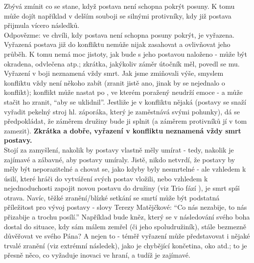\documentclass[../main.tex]{subfiles}
\begin{document}
Zbývá zmínit co se stane, když postava není schopna pokrýt posuny. K tomu může dojít například v delším souboji se silnými protivníky, kdy již postava přijmula vícero následků.\\ 
Odpovězme: ve chvíli, kdy postava není schopna posuny pokrýt, je vyřazena. Vyřazená postava již do konfliktu nemůže nijak zasahovat a ovlivňovat jeho průběh. K tomu nemá moc jistoty, jak bude s jeho postavou naloženo - může být okradena, odvlečena atp.; zkrátka, jakýkoliv záměr útočník měl, povedl se mu. \\
Vyřazení v boji neznamená vždy smrt. Jak jsme zmiňovali výše, smyslem konfliktu vždy není někoho zabít (zranit jistě ano, jinak by se nejednalo o konflikt); konflikt může nastat po , ve kterém poražený neudrží emoce - a může stačit ho zranit, ``aby se uklidnil''. Jestliže je v konfliktu nějaká  (postavy se snaží vyřadit pekelný stroj hl. záporáka, který je zaměstnává svými pohunky), dá se předpokládat, že záměrem družiny bude ji splnit (a záměrem protivníků jí v tom zamezit). \textbf{Zkrátka a dobře, vyřazení v konfliktu neznamená vždy smrt postavy.}\\
Stojí za zamyšlení, nakolik by postavy vlastně měly umírat - tedy, nakolik je zajímavé a zábavné, aby postavy umíraly. Jistě, nikdo netvrdí, že postavy by měly být neporazitelné a chovat se, jako kdyby byly nesmrtelné - ale vzhledem k úsilí, které hráči do vytváření svých postav vložili, nebo vzhledem k nejednoduchosti zapojit novou postavu do družiny (viz Trio fází ), je smrt spíš otrava. Navíc, těžké zranění/blízké setkání se smrtí může být podstatná příležitost pro vývoj postavy - slovy Terezy Matějčkové: ``Co nás nezabije, to nás přizabije a trochu posílí.'' Například bude kněz, který se v následování svého boha dostal do situace, kdy sám málem zemřel (či jeho spoludružiník), stále bezmezně důvěřovat ve svého Pána? A nejen to - téměř vyřazení může představovat i nějaké trvalé zranění (viz extrémní následek), jako je chybějící končetina, oko atd.; to je přesně něco, co vyžaduje inovaci ve hraní, a tudíž je zajímavé.
\end{document}
